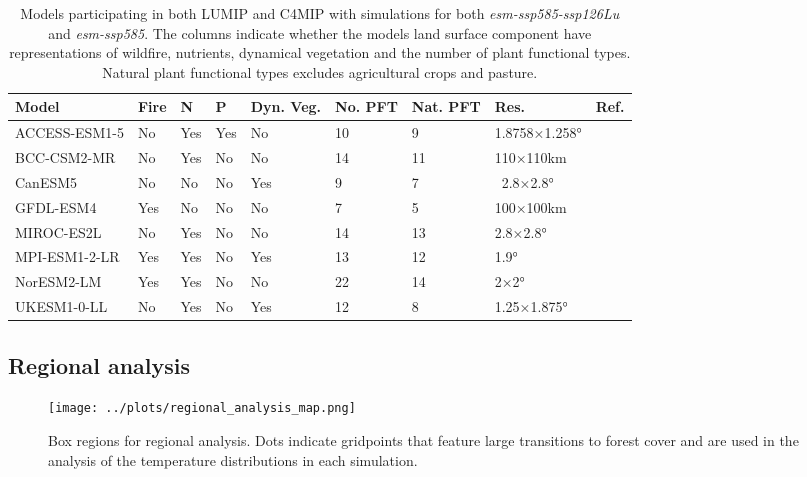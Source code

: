\documentclass[]{article}
\begin{document}
\begin{table}[H]
    \centering
    \begin{tabular}{lllllllll}
        \hline
Model         & Fire & N   & P   & Dyn. Veg. & No. PFT & Nat. PFT & Res. & Ref.                                         \\ \hline
ACCESS-ESM1-5 & No   & Yes & Yes & No    & 10       & 9       & 1.8758×1.258°   & \cite{ziehn_australian_2020}   \\
BCC-CSM2-MR   & No   & Yes & No  & No    & 14       & 11      & 110×110km       & \cite{li_development_2019}     \\
CanESM5       & No   & No  & No  & Yes   & 9        & 7       & ~2.8×2.8°       & \cite{swart_canadian_2019}     \\
GFDL-ESM4     & Yes  & No  & No  & No    & 7        & 5       & 100×100km       & \cite{dunne_gfdl_2020}         \\
MIROC-ES2L    & No   & Yes & No  & No    & 14       & 13      & 2.8×2.8°        & \cite{hajima_development_2020} \\
MPI-ESM1-2-LR & Yes  & Yes & No  & Yes   & 13       & 12      & 1.9°            & \cite{giorgetta_climate_2013}  \\
NorESM2-LM    & Yes  & Yes & No  & No    & 22       & 14      & 2×2°            & \cite{seland_norwegian_2020}   \\
UKESM1-0-LL   & No   & Yes & No  & Yes   & 12       & 8       & 1.25×1.875°     & \cite{sellar_ukesm1_2019}      \\ \hline
    \end{tabular}
    \caption{Models participating in both LUMIP and C4MIP with simulations for both \textit{esm-ssp585-ssp126Lu} and \textit{esm-ssp585}. The columns indicate whether the models land surface component have representations of wildfire, nutrients, dynamical vegetation and the number of plant functional types. Natural plant functional types excludes agricultural crops and pasture.}
    \label{tab:models}
\end{table}

\subsection{Regional analysis}

\begin{figure}[H]
    \centering
    \texttt{[image: ../plots/regional\_analysis\_map.png]}
    \caption{Box regions for regional analysis. Dots indicate gridpoints that feature large transitions to forest cover and are used in the analysis of the temperature distributions in each simulation.}
    \label{fig:box_regions}
\end{figure}
\end{document}
